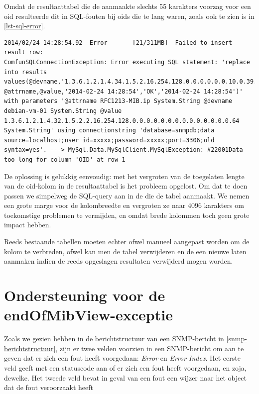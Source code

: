 Omdat de resultaattabel die de \nwmretriever{} aanmaakte slechts 55 karakters voorzag voor een \gls{oid} resulteerde dit
in SQL-fouten bij \glspl{oid} die te lang waren, zoals ook te zien is in \cref{lst-sql-error}.


\begin{lstlisting}[float=h, caption={[SQL-fout bij te lange OID]SQL-fout bij te lange \glspl{oid}}, label=lst-sql-error]
2014/02/24 14:28:54.92	Error		[21/311MB]	Failed to insert result row: 
ComfunSQLConnectionException: Error executing SQL statement: 'replace into results values(@devname,'1.3.6.1.2.1.4.34.1.5.2.16.254.128.0.0.0.0.0.0.10.0.39.255.254.109.189.197', @attrname,@value,'2014-02-24 14:28:54','OK','2014-02-24 14:28:54')' with parameters '@attrname RFC1213-MIB.ip System.String @devname debian-vm-01 System.String @value 1.3.6.1.2.1.4.32.1.5.2.2.16.254.128.0.0.0.0.0.0.0.0.0.0.0.0.0.0.64 System.String' using connectionstring 'database=snmpdb;data source=localhost;user id=xxxxx;password=xxxxx;port=3306;old syntax=yes'. ---> MySql.Data.MySqlClient.MySqlException: #22001Data too long for column 'OID' at row 1
\end{lstlisting}

De oplossing is gelukkig eenvoudig: met het vergroten van de toegelaten lengte van de \gls{oid}-kolom in de resultaattabel is het probleem opgelost.
Om dat te doen passen we simpelweg de SQL-query aan in de \nwmretriever{} die de tabel aanmaakt.
We nemen een grote marge voor de kolombreedte en vergroten ze naar 4096 karakters om toekomstige problemen te vermijden,
en omdat brede kolommen toch geen grote impact hebben.

Reeds bestaande tabellen moeten echter ofwel manueel aangepast worden om de kolom te verbreden,
ofwel kan men de tabel verwijderen en de \nwmretriever{} een nieuwe laten aanmaken indien de reeds opgeslagen resultaten verwijderd mogen worden.


\section{Ondersteuning voor de endOfMibView-exceptie}
\label{probleem-endofmibview-exceptie}

Zoals we gezien hebben in de berichtstructuur van een SNMP-bericht in \cref{snmp-berichtstructuur},
zijn er twee velden voorzien in een SNMP-bericht om aan te geven dat er zich een fout heeft voorgedaan: \textit{Error} en \textit{Error Index}.
Het eerste veld geeft met een statuscode aan of er zich een fout heeft voorgedaan, en zoja, dewelke.
Het tweede veld bevat in geval van een fout een wijzer naar het object dat de fout veroorzaakt heeft

